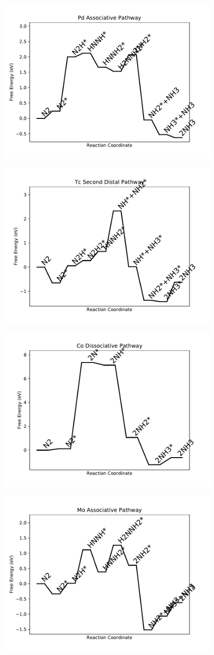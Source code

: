 \documentclass[journal=jacsat,manuscript=article]{achemso}
\begin{document}
\begin{figure}
\includegraphics[width=0.5\linewidth]{data/plots/Pd_associative.pdf}
\label{fig:Pd_associative}
\end{figure}

\begin{figure}
\includegraphics[width=0.5\linewidth]{data/plots/Tc_distal_2.pdf}
\label{fig:Tc_distal_2}
\end{figure}

\begin{figure}
\includegraphics[width=0.5\linewidth]{data/plots/Co_dissociative.pdf}
\label{fig:Co_dissociative}
\end{figure}

\begin{figure}
\includegraphics[width=0.5\linewidth]{data/plots/Mo_associative.pdf}
\label{fig:Mo_associative}
\end{figure}
\end{document}
